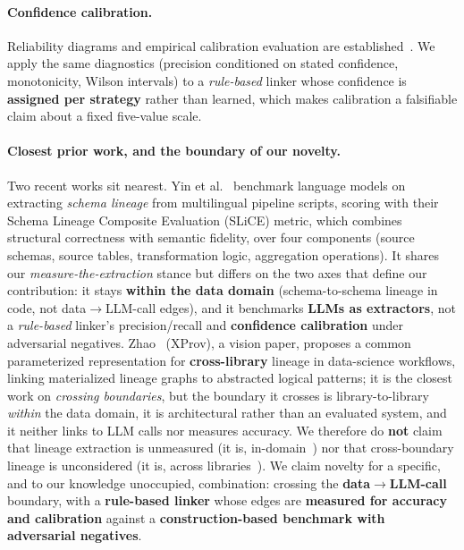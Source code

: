 \documentclass[11pt]{article}
\newcommand{\dto}{\ensuremath{\rightarrow}}     %
\begin{document}
\paragraph{Confidence calibration.} Reliability diagrams and empirical calibration evaluation are
established~\cite{niculescu2005probabilities,guo2017calibration}. We apply the same diagnostics (precision conditioned on stated confidence, monotonicity, Wilson intervals) to a \emph{rule-based} linker
whose confidence is \textbf{assigned per strategy} rather than learned, which makes calibration a falsifiable
claim about a fixed five-value scale.

\paragraph{Closest prior work, and the boundary of our novelty.} Two recent works sit nearest. Yin et
al.~\cite{yin2025schemalineage} benchmark language models on extracting \emph{schema lineage} from
multilingual pipeline scripts, scoring with their Schema Lineage Composite Evaluation (SLiCE) metric, which combines structural correctness with semantic fidelity, over four components (source schemas, source tables,
transformation logic, aggregation operations). It shares our \emph{measure-the-extraction} stance but
differs on the two axes that define our contribution: it stays \textbf{within the data domain}
(schema-to-schema lineage in code, not data\dto{}LLM-call edges), and it benchmarks \textbf{LLMs as
extractors}, not a \emph{rule-based} linker's precision/recall and \textbf{confidence calibration} under
adversarial negatives. Zhao~\cite{zhao2025xprov} (XProv), a vision paper, proposes a common parameterized
representation for \textbf{cross-library} lineage in data-science workflows, linking materialized lineage
graphs to abstracted logical patterns; it is the closest work on \emph{crossing boundaries}, but the
boundary it crosses is library-to-library \emph{within} the data domain, it is architectural rather than an
evaluated system, and it neither links to LLM calls nor measures accuracy. We therefore do \textbf{not}
claim that lineage extraction is unmeasured (it is, in-domain~\cite{yin2025schemalineage}) nor that
cross-boundary lineage is unconsidered (it is, across libraries~\cite{zhao2025xprov}). We claim novelty for
a specific, and to our knowledge unoccupied, combination: crossing the \textbf{data\dto{}LLM-call} boundary,
with a \textbf{rule-based linker} whose edges are \textbf{measured for accuracy and calibration} against a
\textbf{construction-based benchmark with adversarial negatives}.
\end{document}
